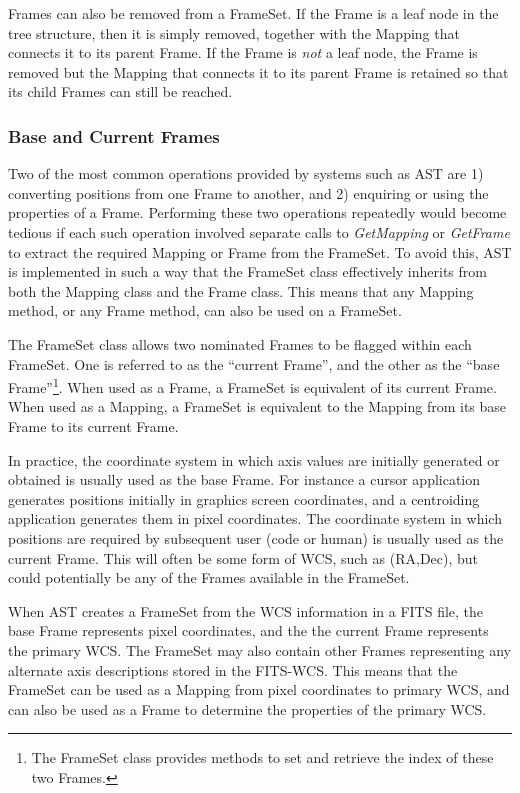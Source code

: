 \documentclass[final,authoryear,5p,times,twocolumn]{elsarticle}
\begin{document}
Frames can also be removed from a FrameSet. If the Frame is a leaf node
in the tree structure, then it is simply removed, together with the
Mapping that  connects it to its parent Frame. If the Frame is \emph{not}
a leaf node, the Frame is removed but the Mapping that connects it to its
parent Frame is retained so that its child Frames can still be reached.

\subsubsection{Base and Current Frames}
Two of the most common operations provided by systems such as AST are 1)
converting positions from one Frame to another, and 2) enquiring or using
the properties of a Frame. Performing these two operations repeatedly
would become tedious if each such operation involved separate calls to
\emph{GetMapping} or \emph{GetFrame} to extract the required Mapping or
Frame from the FrameSet. To avoid this, AST is implemented in such a way
that the FrameSet class effectively inherits from both the Mapping class
and the Frame class. This means that any Mapping method, or any Frame
method, can also be used on a FrameSet.

The FrameSet class allows two nominated Frames to be flagged within each
FrameSet. One is referred to as the ``current Frame'', and the other as
the ``base Frame''\footnote{The FrameSet class provides methods to set
and retrieve the index of these two Frames.}. When used as a Frame, a
FrameSet is equivalent of its current Frame. When used as a Mapping, a
FrameSet is equivalent to the Mapping from its base Frame to its current
Frame.

In practice, the coordinate system in which axis values are initially
generated or obtained is usually used as the base Frame. For instance a
cursor application generates positions initially in graphics screen
coordinates, and a centroiding application generates them in pixel
coordinates.  The coordinate system in which positions are required by
subsequent user (code or human) is usually used as the current Frame. This
will often be some form of WCS, such as (RA,Dec), but could potentially
be any of the Frames available in the FrameSet.

When AST creates a FrameSet from the WCS information in a FITS file, the
base Frame represents pixel coordinates, and the the current Frame
represents the primary WCS. The FrameSet may also contain other Frames
representing any alternate axis descriptions stored in the FITS-WCS.
This means that the FrameSet can be used as a Mapping from pixel
coordinates to primary WCS, and can also be used as a Frame to determine
the properties of the primary WCS.
\end{document}
